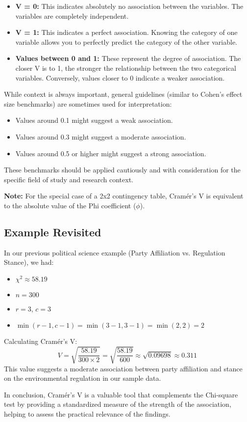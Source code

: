 \documentclass{article}
\begin{document}
\begin{itemize}
    \item \textbf{V = 0:} This indicates absolutely no association between the variables. The variables are completely independent.
    \item \textbf{V = 1:} This indicates a perfect association. Knowing the category of one variable allows you to perfectly predict the category of the other variable.
    \item \textbf{Values between 0 and 1:} These represent the degree of association. The closer V is to 1, the stronger the relationship between the two categorical variables. Conversely, values closer to 0 indicate a weaker association.
\end{itemize}

While context is always important, general guidelines (similar to Cohen's effect size benchmarks) are sometimes used for interpretation:
\begin{itemize}
    \item Values around 0.1 might suggest a weak association.
    \item Values around 0.3 might suggest a moderate association.
    \item Values around 0.5 or higher might suggest a strong association.
\end{itemize}
These benchmarks should be applied cautiously and with consideration for the specific field of study and research context.

\textbf{Note:} For the special case of a 2x2 contingency table, Cramér's V is equivalent to the absolute value of the Phi coefficient ($\phi$).

\subsection{Example Revisited}

In our previous political science example (Party Affiliation vs. Regulation Stance), we had:
\begin{itemize}
    \item $\chi^2 \approx 58.19$
    \item $n = 300$
    \item $r = 3$, $c = 3$
    \item $\min(r-1, c-1) = \min(3-1, 3-1) = \min(2, 2) = 2$
\end{itemize}

Calculating Cramér's V:
$$ V = \sqrt{\frac{58.19}{300 \times 2}} = \sqrt{\frac{58.19}{600}} \approx \sqrt{0.09698} \approx 0.311 $$
This value suggests a moderate association between party affiliation and stance on the environmental regulation in our sample data.

In conclusion, Cramér's V is a valuable tool that complements the Chi-square test by providing a standardized measure of the strength of the association, helping to assess the practical relevance of the findings.
\end{document}
